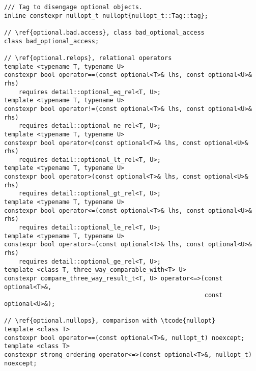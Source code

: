 \documentclass[a4paper,10pt,oneside,openany,final,article]{memoir}
\begin{document}
\begin{verbatim}
/// Tag to disengage optional objects.
inline constexpr nullopt_t nullopt{nullopt_t::Tag::tag};

// \ref{optional.bad.access}, class bad_optional_access
class bad_optional_access;

// \ref{optional.relops}, relational operators
template <typename T, typename U>
constexpr bool operator==(const optional<T>& lhs, const optional<U>& rhs)
    requires detail::optional_eq_rel<T, U>;
template <typename T, typename U>
constexpr bool operator!=(const optional<T>& lhs, const optional<U>& rhs)
    requires detail::optional_ne_rel<T, U>;
template <typename T, typename U>
constexpr bool operator<(const optional<T>& lhs, const optional<U>& rhs)
    requires detail::optional_lt_rel<T, U>;
template <typename T, typename U>
constexpr bool operator>(const optional<T>& lhs, const optional<U>& rhs)
    requires detail::optional_gt_rel<T, U>;
template <typename T, typename U>
constexpr bool operator<=(const optional<T>& lhs, const optional<U>& rhs)
    requires detail::optional_le_rel<T, U>;
template <typename T, typename U>
constexpr bool operator>=(const optional<T>& lhs, const optional<U>& rhs)
    requires detail::optional_ge_rel<T, U>;
template <class T, three_way_comparable_with<T> U>
constexpr compare_three_way_result_t<T, U> operator<=>(const optional<T>&,
                                                       const optional<U>&);

// \ref{optional.nullops}, comparison with \tcode{nullopt}
template <class T>
constexpr bool operator==(const optional<T>&, nullopt_t) noexcept;
template <class T>
constexpr strong_ordering operator<=>(const optional<T>&, nullopt_t) noexcept;


\end{verbatim}
\end{document}
